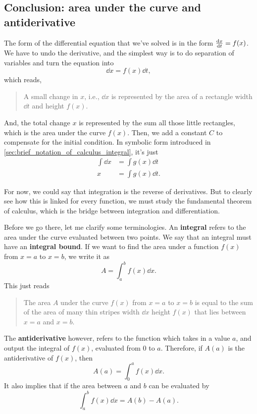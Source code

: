\subsection{Conclusion: area under the curve and antiderivative}

The form of the differential equation that we've solved is in the form $\dv{x}{t} = f(x)$. We have to undo the derivative, and the simplest way is to do separation of variables and turn the equation into
\begin{equation}
    \dd{x} = f(x)\dd{t},
\end{equation}
which reads,
\begin{quotation}
    A small change in $x$, i.e., $\dd{x}$ is represented by the area of a rectangle width $\dd{t}$ and height $f(x)$.
\end{quotation}
And, the total change $x$ is represented by the sum all those little rectangles, which is the area under the curve $f(x)$. Then, we add a constant $C$ to compensate for the initial condition. In symbolic form introduced in \cref{sec:brief_notation_of_calculus_integral}, it's just
\begin{align}
    \int\dd{x} &= \int g(x)\dd{t} \\
    x &= \int g(x)\dd{t}.
\end{align}

For now, we could say that integration is the reverse of derivatives. But to clearly see how this is linked for every function, we must study the fundamental theorem of calculus, which is the bridge between integration and differentiation.

Before we go there, let me clarify some terminologies. An \textbf{integral} refers to the area under the curve evaluated between two points. We say that an integral must have an \textbf{integral bound}. If we want to find the area under a function $f(x)$ from $x = a$ to $x = b$, we write it as
\begin{equation}
    A = \int_a^b f(x)\dd{x}.
\end{equation}
This just reads
\begin{quotation}
    The area $A$ under the curve $f(x)$ from $x = a$ to $x = b$ is equal to the sum of the area of many thin stripes width $\dd{x}$ height $f(x)$ that lies between $x = a$ and $x = b$.
\end{quotation}
The \textbf{antiderivative} however, refers to the function which takes in a value $a$, and output the integral of $f(x)$, evaluated from $0$ to $a$. Therefore, if $A(a)$ is the antiderivative of $f(x)$, then
\begin{equation}
    A(a) = \int_0^a f(x)\dd{x}.
\end{equation}
It also implies that if the area between $a$ and $b$ can be evaluated by
\begin{equation}
    \int_a^b f(x)\dd{x} = A(b) - A(a).
\end{equation}

